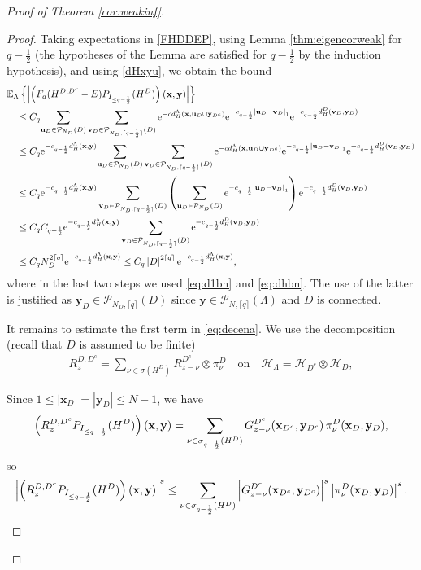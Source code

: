 \documentclass[12pt, a4paper,reqno]{amsart}
\numberwithin{equation}{section}
\newcommand\x{\mathbf{x}}
\newcommand\y{\mathbf{y}}
\renewcommand\u{\mathbf{u}}
\renewcommand\v{\mathbf{v}}
\newcommand\e{\mathrm{e}}
\newcommand\E{\mathbb E}
\newcommand\cH{\mathcal{H}}
\newcommand\cP{\mathcal{P}}
\newcommand\be{\begin{equation}\begin{aligned}}
\newcommand\ee{\end{aligned}\end{equation}}
\newcommand{\abs}[1]{\left\lvert #1 \right\rvert}
\newcommand{\set}[1]{\left\{ #1 \right\}}
\newcommand{\pa}[1]{\left( #1 \right)}
\newcommand{\cl}[1]{\lceil #1 \rceil}
\newcommand\La{\Lambda}
\newcommand{\eq}[1]{\eqref{#1}}
\newcommand{\qtx}[1]{\quad\text{#1}\quad}
\begin{document}
\begin{proof}[Proof of  Theorem \ref{cor:weakinf}]
\begin{proof}
Taking expectations in \eq{FHDDEP}, using  Lemma \ref{thm:eigencorweak} for $q-\frac 12$ (the hypotheses of the  Lemma  are satisfied for $q-\frac 12$ by the induction hypothesis), and using \eq{dHxyu},
we obtain the bound
\be \label{FPxy}
&\E_\La \set{\abs{\pa{F_{a}(H^{D,D^c}-E) P_{I_{\le q-\frac12}}(H^{D})}({\bf x},{\bf y})}} \\& \quad  \le 
C_q {\sum_{{\u_D}\in \cP_{N_D}(D)}\sum_{{\v_D}\in\cP_{{N_D},\lceil q-\frac12\rceil}(D)} \e^{-c d_H^{  \La } {({\bf x},\u_D \cup\y_{D^c})}}\e^{-c_{q-\frac 1 2}\abs{{\u_D}-{\v_D}}_1}} \e^{-c_{q-\frac 12 } d_H^D (\v_D,\y_D)}\\
&\quad \le  C_q \e^{-c_{q-\frac 12 }  d_H^{  \La } {({\bf x},\y)}} {\sum_{{\u_D}\in \cP_{N_D}(D)}\sum_{{\v_D}\in\cP_{{N_D},\lceil q-\frac12\rceil}(D)} \e^{-c d_H^{  \La } {({\bf x},\u_D \cup\y_{D^c})}}\e^{-c_{q-\frac 1 2}\abs{{\u_D}-{\v_D}}_1}} \e^{-c_{q-\frac 12 }  d_H^D (\v_D,\y_D)}\\
&\quad \le  C_q \e^{-c_{q-\frac 12 }  d_H^{  \La } {({\bf x},\y)}} \sum_{{\v_D}\in\cP_{{N_D},\lceil q-\frac12\rceil}(D)} 
 \pa{\sum_{{\u_D}\in \cP_{N_D}(D)}\e^{-c_{q-\frac 1 2}\abs{{\u_D}-{\v_D}}_1}} \e^{-c_{q-\frac 12 }  d_H^D (\v_D,\y_D)}\\
&\quad \le  C_q C_{q-\frac 1 2} \e^{-c_{q-\frac 12 }  d_H^{  \La } {({\bf x},\y)}} \sum_{{\v_D}\in\cP_{{N_D},\lceil q-\frac  12\rceil}(D)} 
  \e^{-c_{q-\frac 12 }  d_H^D (\v_D,\y_D)}\\
&\quad \le  C_q  N_D^{2\cl{q}}  \e^{-c_{q-\frac 12 }  d_H^{  \La } {({\bf x},\y)}}\le  C_q  \abs{D}^{2\cl{q}}  \e^{-c_{q-\frac 12 }  d_H^{  \La } {({\bf x},\y)}}, 
\ee  
where in the last two steps we used  \eq{eq:d1bn} and \eq{eq:dhbn}.  The use of the latter is justified  as $\y_D\in \cP_{{N_D},\lceil q\rceil}(D)$ since $ \y\in \cP_{{N},\lceil q\rceil}(\La)$ and $D$ is connected.





It remains to estimate the first term in \eq{eq:decena}.  We use  the decomposition 
 (recall that $D$ is assumed to be finite) 
\be
R_z^{D,D^c} =\sum_{\nu\in \sigma (H^{D})} R_{z-\nu}^{D^c}\otimes \pi_{\nu}^{D}  \qtx{on} \cH_\La= \cH_{D^c}\otimes \cH_{D},
\ee

Since $1\le \abs{\x _ D}= \abs{\y_D}\le N-1  $,
we have 
\be
\pa{R_z^{D,D^c}P_{I_{\le q-\frac12}}(H^{D})}({\bf x},{\bf y})=\sum_{\nu \in \sigma_{q-\frac12}(H^D)} G_{z-\nu}^{D^c}({\bf x}_{D^c},{\bf y}_{D^c})\, \pi^D_{\nu}({\bf x}_D,{\bf y}_D),
\ee 
so
\be\label{eq:fsm}
\abs{\pa{R_z^{D,D^c}P_{I_{\le q-\frac12}}(H^{D})}({\bf x},{\bf y})}^{s}\le\sum_{\nu \in \sigma_{q-\frac12}(H^D)}\abs{G_{z-\nu}^{D^c}({\bf x}_{D^c},{\bf y}_{D^c})}^{s}  \abs{ \pi^D_{\nu}({\bf x}_D,{\bf y}_D)}^{s}.
\ee



\end{proof}
\end{proof}
\end{document}

